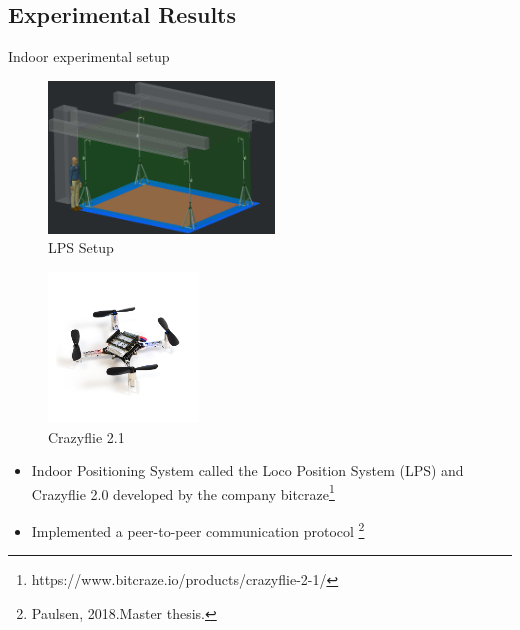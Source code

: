 \subsection{Experimental Results}
\begin{frame}{Indoor experimental setup}

\begin{minipage}{0.55\textwidth}	
    \begin{figure}[h!]
	\includegraphics[width=6cm]{figures/LPS_Setup.png}
	\caption{LPS Setup}
	\label{fig:control_arch}	
\end{figure}		
\end{minipage}
	\hspace{0.05cm}
\begin{minipage}{0.35\textwidth}
    \begin{figure}[h!]
	\includegraphics[width=4cm]{figures/crazyflie_2_1_585px.jpg}
	\caption{Crazyflie 2.1}
	\label{fig:control_arch}	
\end{figure}		
\end{minipage}

\begin{itemize}
	\item Indoor Positioning System called the Loco Position System (LPS) and Crazyflie 2.0 developed by the company bitcraze\footnote{https://www.bitcraze.io/products/crazyflie-2-1/}
	\item Implemented a peer-to-peer communication protocol \footnote{Paulsen, 2018.Master thesis.}
\end{itemize}
\end{frame}
